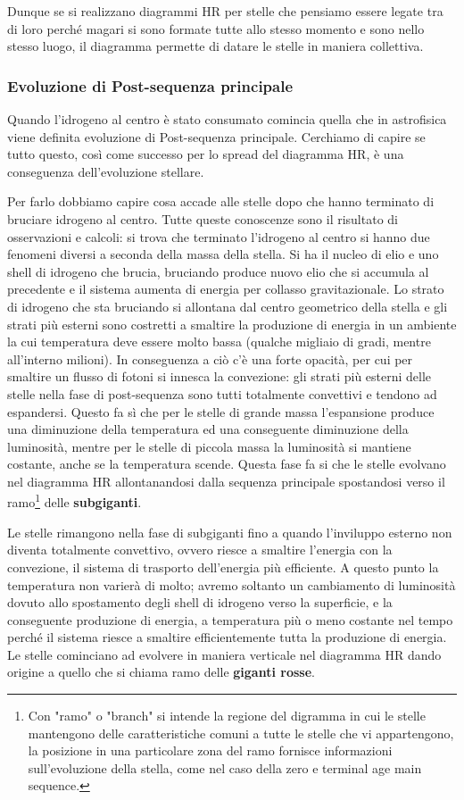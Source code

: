Dunque se si realizzano diagrammi HR per stelle che pensiamo essere legate tra di loro perché magari si sono formate tutte allo stesso momento e sono nello stesso luogo, il diagramma permette di datare le stelle in maniera collettiva.

\subsubsection{Evoluzione di Post-sequenza principale}

Quando l'idrogeno al centro è stato consumato comincia quella che in astrofisica viene definita evoluzione di Post-sequenza principale. Cerchiamo di capire se tutto questo, così come successo per lo spread del diagramma HR, è una conseguenza dell'evoluzione stellare.

Per farlo dobbiamo capire cosa accade alle stelle dopo che hanno terminato di bruciare idrogeno al centro. Tutte queste conoscenze sono il risultato di osservazioni e calcoli: si trova che terminato l'idrogeno al centro si hanno due fenomeni diversi a seconda della massa della stella. Si ha il nucleo di elio e uno shell di idrogeno che brucia, bruciando produce nuovo elio che si accumula al precedente e il sistema aumenta di energia per collasso gravitazionale. Lo strato di idrogeno che sta bruciando si allontana dal centro geometrico della stella e gli strati più esterni sono costretti a smaltire la produzione di energia in un ambiente la cui temperatura deve essere molto bassa (qualche migliaio di gradi, mentre all'interno milioni). In conseguenza a ciò c'è una forte opacità, per cui per smaltire un flusso di fotoni  si innesca la convezione: gli strati più esterni delle stelle nella fase di post-sequenza sono tutti totalmente convettivi e tendono ad espandersi. Questo fa sì che per le stelle di grande massa l'espansione produce una diminuzione della temperatura ed una conseguente diminuzione della luminosità, mentre per le stelle di piccola massa la luminosità si mantiene costante, anche se la temperatura scende. Questa fase fa si che le stelle evolvano nel diagramma HR allontanandosi dalla sequenza principale spostandosi verso il ramo\footnote{Con "ramo" o "branch" si intende la regione del digramma in cui le stelle mantengono delle caratteristiche comuni a tutte le stelle che vi appartengono, la posizione in una particolare zona del ramo fornisce informazioni sull'evoluzione della stella, come nel caso della zero e terminal age main sequence.} delle \textbf{subgiganti}.

Le stelle rimangono nella fase di subgiganti fino a quando l'inviluppo esterno non diventa totalmente convettivo, ovvero riesce a smaltire l'energia con la convezione, il sistema di trasporto dell'energia più efficiente. A questo punto la temperatura non varierà di molto; avremo soltanto un cambiamento di luminosità dovuto allo spostamento degli shell di idrogeno verso la superficie, e la conseguente produzione di energia, a temperatura più o meno costante nel tempo perché il sistema riesce a smaltire efficientemente tutta la produzione di energia. Le stelle cominciano ad evolvere in maniera verticale nel diagramma HR dando origine a quello che si chiama ramo delle \textbf{giganti rosse}.

